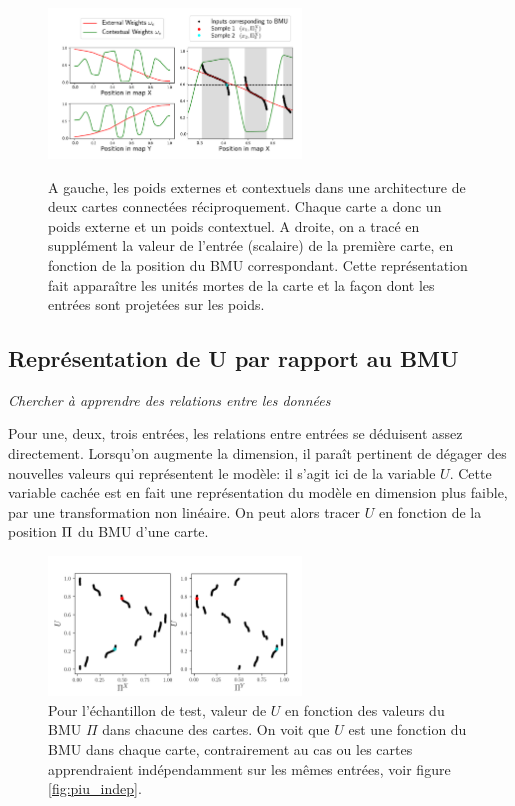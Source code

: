 \begin{figure}
\centering\includegraphics[width=0.6\textwidth]{weights_2SOM}
\label{fig:2som}
\caption{A gauche, les poids externes et contextuels dans une architecture de deux cartes connectées réciproquement. Chaque carte a donc un poids externe et un poids contextuel. A droite, on a tracé en supplément la valeur de l'entrée (scalaire) de la première carte, en fonction de la position du BMU correspondant. Cette représentation fait apparaître les unités mortes de la carte et la façon dont les entrées sont projetées sur les poids.}
\end{figure}

\subsection{Représentation de U par rapport au BMU}
\emph{Chercher à apprendre des relations entre les données}

Pour une, deux, trois entrées, les relations entre entrées se déduisent assez directement. Lorsqu'on augmente la dimension, il paraît pertinent de dégager des nouvelles valeurs qui représentent le modèle: il s'agit ici de la variable $U$. Cette variable cachée est en fait une représentation du modèle en dimension plus faible, par une transformation non linéaire. On peut alors tracer $U$ en fonction de la position $\Pi$ du BMU d'une carte. 

\begin{figure}
\centering
\includegraphics[width = 0.6\textwidth]{XU_YU.pdf}
\caption{Pour l'échantillon de test, valeur de $U$ en fonction des valeurs du BMU $\Pi$ dans chacune des cartes. On voit que $U$ est une fonction du BMU dans chaque carte, contrairement au cas ou les cartes apprendraient indépendamment sur les mêmes entrées, voir figure \ref{fig:piu_indep}.}
\label{fig:piu}
\end{figure}

